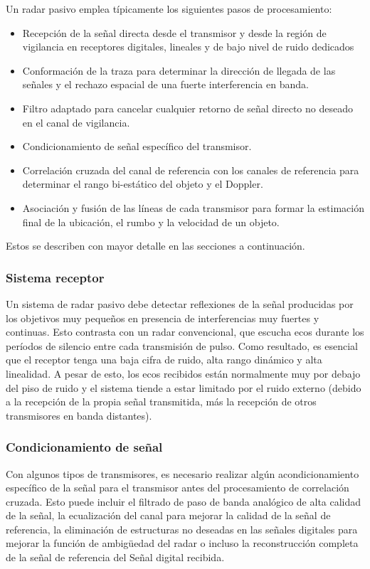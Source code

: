 Un radar pasivo emplea típicamente los siguientes pasos de procesamiento:
\begin{itemize}
    \item Recepción de la señal directa desde el transmisor y desde la región de vigilancia en receptores digitales, lineales y de bajo nivel de ruido dedicados
    \item Conformación de la traza para determinar la dirección de llegada de las señales y el rechazo espacial de una fuerte interferencia en banda.
    \item Filtro adaptado para cancelar cualquier retorno de señal directo no deseado en el canal de vigilancia.
    \item Condicionamiento de señal específico del transmisor.
    \item Correlación cruzada del canal de referencia con los canales de referencia para determinar el rango bi-estático del objeto y el Doppler.
    \item Asociación y fusión de las líneas de cada transmisor para formar la estimación final de la ubicación, el rumbo y la velocidad de un objeto.
\end{itemize}


Estos se describen con mayor detalle en las secciones a continuación.


\subsubsection{Sistema receptor}
Un sistema de radar pasivo debe detectar reflexiones de la señal producidas por los objetivos muy pequeños en presencia de interferencias muy fuertes y continuas. Esto contrasta con un radar convencional, que escucha ecos durante los períodos de silencio entre cada transmisión de pulso. Como resultado, es esencial que el receptor tenga una baja cifra de ruido, alta rango dinámico y alta linealidad. A pesar de esto, los ecos recibidos están normalmente muy por debajo del piso de ruido y el sistema tiende a estar limitado por el ruido externo (debido a la recepción de la propia señal transmitida, más la recepción de otros transmisores en banda distantes). 

\subsubsection{Condicionamiento de señal}
Con algunos tipos de transmisores, es necesario realizar algún acondicionamiento específico de la señal para el transmisor antes del procesamiento de correlación cruzada. Esto puede incluir el filtrado de paso de banda analógico de alta calidad de la señal, la ecualización del canal para mejorar la calidad de la señal de referencia, la eliminación de estructuras no deseadas en las señales digitales para mejorar la función de ambigüedad del radar o incluso la reconstrucción completa de la señal de referencia del Señal digital recibida.


